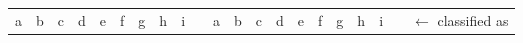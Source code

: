 \documentclass[runningheads,a4paper]{llncs}
\begin{document}
\begin{figure}
\begin{scriptsize}
\begin{tabular}{|ccccccccc|p{0.01cm}|ccccccccc|p{0.01cm}|l}
		\multicolumn{1}{c}{a} & b & c & d & e & f & g & h & \multicolumn{1}{c}{i} &\multicolumn{1}{c}{}& 
			\multicolumn{1}{c}{a} & b & c & d & e & f & g & h & \multicolumn{1}{c}{i} 	&\multicolumn{1}{c}{}& $\leftarrow$ classified as\\
		\cline{1-9} \cline{11-19} \cline{21-21}
% 	


\end{tabular}
\end{scriptsize}
\end{figure}
\end{document}

